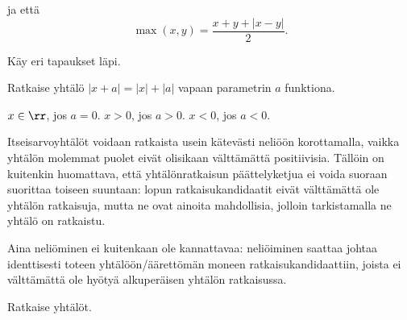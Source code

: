 \begin{tehtavasivu}
\begin{tehtava}
	ja että
	\[
		\max(x,y) = \frac{x+y+|x-y|}{2}.
	\]
	\begin{vastaus}
		Käy eri tapaukset läpi.
	\end{vastaus}
\end{tehtava}

\begin{tehtava}
	Ratkaise yhtälö $|x+a| = |x|+|a|$ vapaan parametrin $a$ funktiona.
	\begin{vastaus}
		$x \in \rr$, jos $a=0$. $x>0$, jos $a>0$. $x<0$, jos $a<0$.
	\end{vastaus}
\end{tehtava}

\begin{tehtava}
	Itseisarvoyhtälöt voidaan ratkaista usein kätevästi neliöön korottamalla, vaikka yhtälön molemmat puolet eivät olisikaan välttämättä positiivisia. Tällöin on kuitenkin huomattava, että yhtälönratkaisun päättelyketjua ei voida suoraan suorittaa toiseen suuntaan: lopun ratkaisukandidaatit eivät välttämättä ole yhtälön ratkaisuja, mutta ne ovat ainoita mahdollisia, jolloin tarkistamalla ne yhtälö on ratkaistu. 

	Aina neliöminen ei kuitenkaan ole kannattavaa: neliöiminen saattaa johtaa identtisesti toteen yhtälöön/äärettömän moneen ratkaisukandidaattiin, joista ei välttämättä ole hyötyä alkuperäisen yhtälön ratkaisussa.

	Ratkaise yhtälöt.
	\begin{vastaus}
	\end{vastaus}
\end{tehtava}

\end{tehtavasivu}
